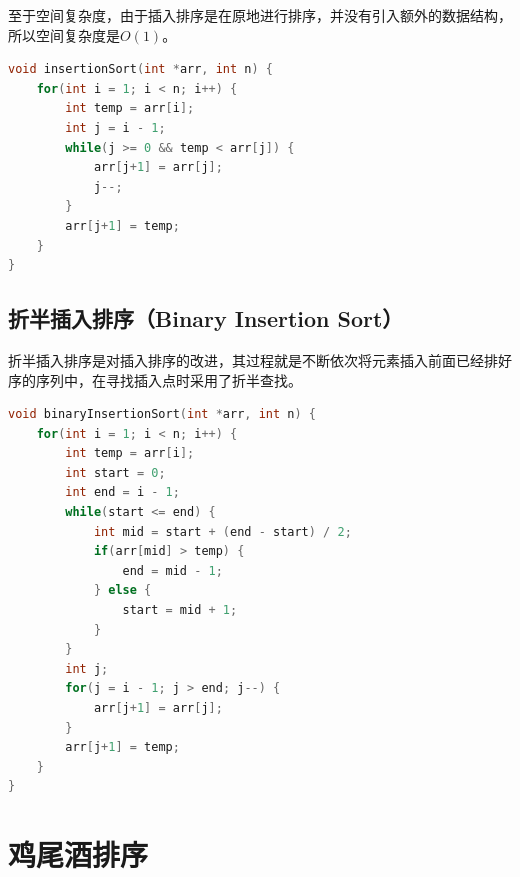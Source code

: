 至于空间复杂度，由于插入排序是在原地进行排序，并没有引入额外的数据结构，所以空间复杂度是$ O(1) $。

\begin{table}[H]
	\centering
	\caption{插入排序算法分析}
\end{table}


\begin{lstlisting}[language=C]
void insertionSort(int *arr, int n) {
    for(int i = 1; i < n; i++) {
        int temp = arr[i];
        int j = i - 1;
        while(j >= 0 && temp < arr[j]) {
            arr[j+1] = arr[j];
            j--;
        }
        arr[j+1] = temp;
    }
}
\end{lstlisting}

\vspace{0.5cm}

\subsection{折半插入排序（Binary Insertion Sort）}

折半插入排序是对插入排序的改进，其过程就是不断依次将元素插入前面已经排好序的序列中，在寻找插入点时采用了折半查找。\\


\begin{lstlisting}[language=C]
void binaryInsertionSort(int *arr, int n) {
    for(int i = 1; i < n; i++) {
        int temp = arr[i];
        int start = 0;
        int end = i - 1;
        while(start <= end) {
            int mid = start + (end - start) / 2;
            if(arr[mid] > temp) {
                end = mid - 1;
            } else {
                start = mid + 1;
            }
        }
        int j;
        for(j = i - 1; j > end; j--) {
            arr[j+1] = arr[j];
        }
        arr[j+1] = temp;
    }
}
\end{lstlisting}

\newpage

\section{鸡尾酒排序}

